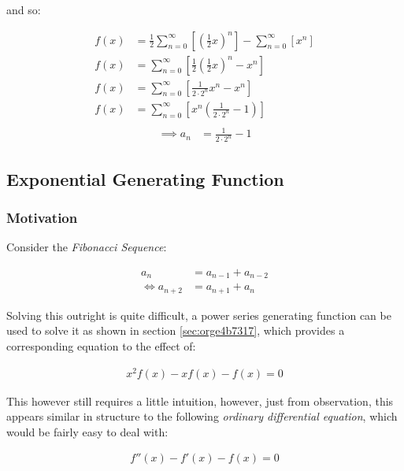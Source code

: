 \documentclass[11pt]{article}
\begin{document}
and so:

\begin{align*}
f\left( x \right) &= \frac{1}{2}\sum^{\infty}_{n= 0}\left[ \left( \frac{1}{2}x \right) ^n \right] - \sum^{\infty}_{n= 0}\left[ x^n \right] \\
f\left( x \right) &= \sum^{\infty}_{n= 0}\left[ \frac{1}{2}\left( \frac{1}{2}x \right) ^n -x^n \right]  \\
f\left( x \right) &= \sum^{\infty}_{n= 0}\left[ \frac{1}{2 \cdot 2^n} x^n -x^n \right]  \\
f\left( x \right) &= \sum^{\infty}_{n= 0}\left[x^n {\left( {\frac{1}{2 \cdot 2^n} -1} \right) } \right]  \\
\end{align*}
\begin{align}
 \implies  a_n &= \frac{1}{2 \cdot 2^n} - 1 \label{eq:seq-end-value}
\end{align}

\subsection{Exponential Generating Function}
\label{sec:orgfcd5233}
\subsubsection{Motivation}
\label{sec:org44082bb}
Consider the \emph{Fibonacci Sequence}:


\begin{align}
    a_{n}&= a_{n - 1} + a_{n - 2} \nonumber \\
\iff a_{n+  2} &= a_{n+  1} +  a_n \label{eq:fib-def}
\end{align}


Solving this outright is quite difficult, a power
series generating function can be used to solve it as shown in section \ref{sec:orge4b7317}, which provides a corresponding equation to the effect of:


\begin{align*}
x^2 f\left( x \right) -  x f \left( x \right) -  f\left( x \right)=  0
\end{align*}

This however still requires a little intuition, however, just from observation, this appears similar in structure to
the following \emph{ordinary differential equation}, which would be fairly easy to deal with:


\begin{align*}
f''\left( x \right)- f'\left( x \right)- f\left( x \right)=  0
\end{align*}
\end{document}
